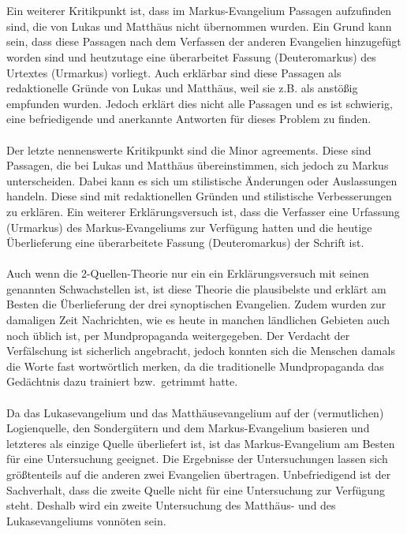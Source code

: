 \\~\\
Ein weiterer Kritikpunkt ist, dass im Markus-Evangelium Passagen aufzufinden sind, die von Lukas und Matthäus nicht übernommen wurden. Ein Grund kann sein, dass diese Passagen nach dem Verfassen der anderen Evangelien hinzugefügt worden sind und heutzutage eine überarbeitet Fassung (Deuteromarkus) des Urtextes (Urmarkus) vorliegt. Auch erklärbar sind diese Passagen als redaktionelle Gründe von Lukas und Matthäus, weil sie z.B. als anstößig empfunden wurden. Jedoch erklärt dies nicht alle Passagen und es ist schwierig, eine befriedigende und anerkannte Antworten für dieses Problem zu finden.
\\~\\
Der letzte nennenswerte Kritikpunkt sind die Minor agreements. Diese sind Passagen, die bei Lukas und Matthäus übereinstimmen, sich jedoch zu Markus unterscheiden. Dabei kann es sich um stilistische Änderungen oder Auslassungen handeln. Diese sind mit redaktionellen Gründen und stilistische Verbesserungen zu erklären. Ein weiterer Erklärungsversuch ist, dass  die Verfasser eine Urfassung (Urmarkus) des Markus-Evangeliums zur Verfügung hatten und die heutige Überlieferung eine überarbeitete Fassung (Deuteromarkus) der Schrift ist.
\\~\\
Auch wenn die 2-Quellen-Theorie nur ein ein Erklärungsversuch mit seinen genannten Schwachstellen ist, ist diese Theorie die plausibelste und erklärt am Besten die Überlieferung der drei synoptischen Evangelien. Zudem wurden zur damaligen Zeit Nachrichten, wie es heute in manchen ländlichen Gebieten auch noch üblich ist, per Mundpropaganda weitergegeben. Der Verdacht der Verfälschung ist sicherlich angebracht, jedoch konnten sich die Menschen damals die Worte fast wortwörtlich merken, da die traditionelle Mundpropaganda das Gedächtnis dazu trainiert bzw.\ getrimmt hatte.
\\~\\
Da das Lukasevangelium und das Matthäusevangelium auf der (vermutlichen) Logienquelle, den Sondergütern und dem Markus-Evangelium basieren und letzteres als einzige Quelle überliefert ist, ist das Markus-Evangelium am Besten für eine Untersuchung geeignet. Die Ergebnisse der Untersuchungen lassen sich größtenteils auf die anderen zwei Evangelien übertragen. Unbefriedigend ist der Sachverhalt, dass die zweite Quelle nicht für eine Untersuchung zur Verfügung steht. Deshalb wird ein zweite Untersuchung des Matthäus- und des Lukasevangeliums vonnöten sein.

